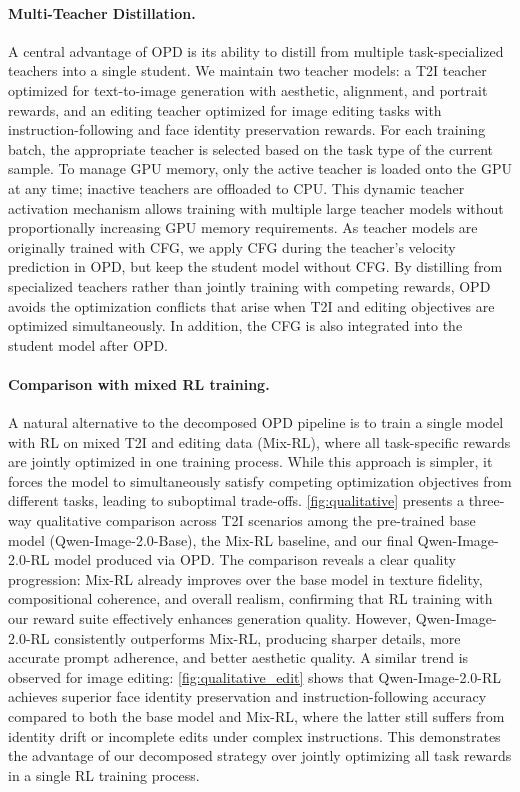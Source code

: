 \documentclass{llmxive}
\begin{document}
\paragraph{Multi-Teacher Distillation.} A central advantage of OPD is its ability to distill from multiple task-specialized teachers into a single student. We maintain two teacher models: a T2I teacher optimized for text-to-image generation with aesthetic, alignment, and portrait rewards, and an editing teacher optimized for image editing tasks with instruction-following and face identity preservation rewards. For each training batch, the appropriate teacher is selected based on the task type of the current sample. To manage GPU memory, only the active teacher is loaded onto the GPU at any time; inactive teachers are offloaded to CPU. This dynamic teacher activation mechanism allows training with multiple large teacher models without proportionally increasing GPU memory requirements. As teacher models are originally trained with CFG, we apply CFG during the teacher's velocity prediction in OPD, but keep the student model without CFG. By distilling from specialized teachers rather than jointly training with competing rewards, OPD avoids the optimization conflicts that arise when T2I and editing objectives are optimized simultaneously. In addition, the CFG is also integrated into the student model after OPD.

\paragraph{Comparison with mixed RL training.} A natural alternative to the decomposed OPD pipeline is to train a single model with RL on mixed T2I and editing data (Mix-RL), where all task-specific rewards are jointly optimized in one training process. While this approach is simpler, it forces the model to simultaneously satisfy competing optimization objectives from different tasks, leading to suboptimal trade-offs. \cref{fig:qualitative} presents a three-way qualitative comparison across T2I scenarios among the pre-trained base model (Qwen-Image-2.0-Base), the Mix-RL baseline, and our final Qwen-Image-2.0-RL model produced via OPD. The comparison reveals a clear quality progression: Mix-RL already improves over the base model in texture fidelity, compositional coherence, and overall realism, confirming that RL training with our reward suite effectively enhances generation quality. However, Qwen-Image-2.0-RL consistently outperforms Mix-RL, producing sharper details, more accurate prompt adherence, and better aesthetic quality. A similar trend is observed for image editing: \cref{fig:qualitative_edit} shows that Qwen-Image-2.0-RL achieves superior face identity preservation and instruction-following accuracy compared to both the base model and Mix-RL, where the latter still suffers from identity drift or incomplete edits under complex instructions. This demonstrates the advantage of our decomposed strategy over jointly optimizing all task rewards in a single RL training process.
\end{document}
